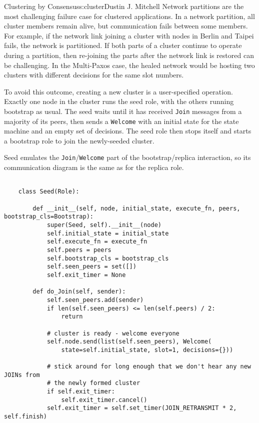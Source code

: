 \begin{aosachapter}{Clustering by Consensus}{s:cluster}{Dustin J. Mitchell}
Network partitions are the most challenging failure case for clustered
applications. In a network partition, all cluster members remain alive,
but communication fails between some members. For example, if the
network link joining a cluster with nodes in Berlin and Taipei fails,
the network is partitioned. If both parts of a cluster continue to
operate during a partition, then re-joining the parts after the network
link is restored can be challenging. In the Multi-Paxos case, the healed
network would be hosting two clusters with different decisions for the
same slot numbers.

To avoid this outcome, creating a new cluster is a user-specified
operation. Exactly one node in the cluster runs the seed role, with the
others running bootstrap as usual. The seed waits until it has received
\texttt{Join} messages from a majority of its peers, then sends a
\texttt{Welcome} with an initial state for the state machine and an
empty set of decisions. The seed role then stops itself and starts a
bootstrap role to join the newly-seeded cluster.

Seed emulates the \texttt{Join}/\texttt{Welcome} part of the
bootstrap/replica interaction, so its communication diagram is the same
as for the replica role.

\begin{verbatim}

    class Seed(Role):
    
        def __init__(self, node, initial_state, execute_fn, peers, bootstrap_cls=Bootstrap):
            super(Seed, self).__init__(node)
            self.initial_state = initial_state
            self.execute_fn = execute_fn
            self.peers = peers
            self.bootstrap_cls = bootstrap_cls
            self.seen_peers = set([])
            self.exit_timer = None
    
        def do_Join(self, sender):
            self.seen_peers.add(sender)
            if len(self.seen_peers) <= len(self.peers) / 2:
                return
    
            # cluster is ready - welcome everyone
            self.node.send(list(self.seen_peers), Welcome(
                state=self.initial_state, slot=1, decisions={}))
    
            # stick around for long enough that we don't hear any new JOINs from
            # the newly formed cluster
            if self.exit_timer:
                self.exit_timer.cancel()
            self.exit_timer = self.set_timer(JOIN_RETRANSMIT * 2, self.finish)
    

\end{verbatim}
\end{aosachapter}
